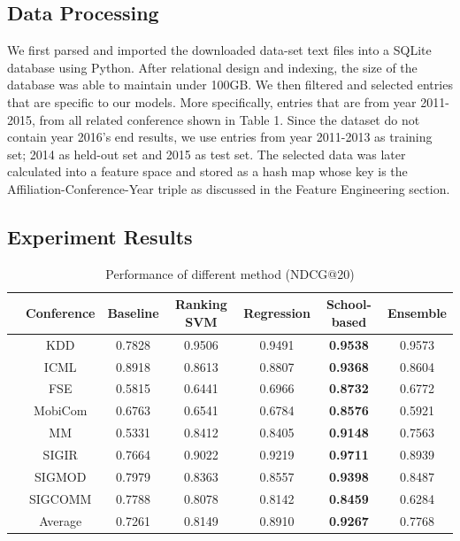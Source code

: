 \documentclass[letterpaper]{article}
\begin{document}
\subsection{Data Processing}
We first parsed and imported the downloaded data-set text files into a SQLite database using Python. After relational design and indexing, the size of the database was able to maintain under 100GB. 
We then filtered and selected entries that are specific to our models. More specifically, entries that are from year 2011-2015, from all related conference shown in Table 1.
Since the dataset do not contain year 2016's end results, we use entries from year 2011-2013 as training set; 2014 as held-out set and 2015 as test set.
The selected data was later calculated into a feature space and stored as a hash map whose key is the Affiliation-Conference-Year triple as discussed in the Feature Engineering section. 

\subsection{Experiment Results}
 

\begin{table}[h]
\centering\scriptsize
\caption{Performance of different method (NDCG@20)
\newline}
    \begin{tabular}{ccccccc}
    \hline
          & Conference& Baseline & Ranking SVM & Regression & School-based&Ensemble\\
    \hline
     
        &KDD& 0.7828& 0.9506& 0.9491&\textbf{0.9538}&0.9573\\
        &ICML& 0.8918& 0.8613& 0.8807& \textbf{0.9368}&0.8604\\
        &FSE& 0.5815& 0.6441& 0.6966&\textbf{0.8732}&0.6772\\
        &MobiCom& 0.6763& 0.6541& 0.6784&\textbf{0.8576}&0.5921\\
        &MM& 0.5331& 0.8412& 0.8405& \textbf{0.9148}&0.7563\\
        &SIGIR& 0.7664& 0.9022& 0.9219& \textbf{0.9711}&0.8939\\
        &SIGMOD& 0.7979& 0.8363& 0.8557& \textbf{0.9398}&0.8487\\
        &SIGCOMM&0.7788&0.8078& 0.8142& \textbf{0.8459}&0.6284\\
        &Average& 0.7261& 0.8149& 0.8910& \textbf{0.9267}& 0.7768\\
 
    \hline
\end{tabular}%
\end{table}%
\end{document}
